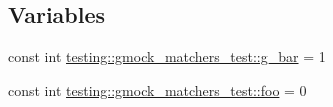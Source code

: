 \subsection*{Variables}
\begin{DoxyCompactItemize}
\item 
const int \hyperlink{namespacetesting_1_1gmock__matchers__test_a55dcc962203a3a3361d2e7e00ed99b4d}{testing\+::gmock\+\_\+matchers\+\_\+test\+::g\+\_\+bar} = 1
\item 
const int \hyperlink{namespacetesting_1_1gmock__matchers__test_a3536e68112ffbb1f76887cd15bb45c15}{testing\+::gmock\+\_\+matchers\+\_\+test\+::foo} = 0
\end{DoxyCompactItemize}
